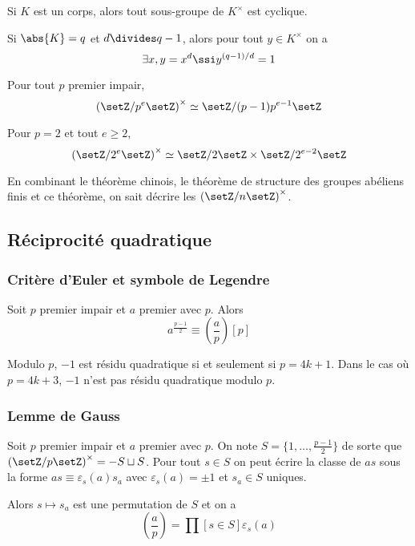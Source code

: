 \documentclass[a4paper,11pt,twocolumn]{article}
\begin{document}
     Si $K$ est un corps, alors tout sous-groupe de $K^\times$ est cyclique.

     Si $\abs{K}=q$ et $d\divides q-1$, alors pour tout $y\in K^\times$ on a
    \[\exists x, y = x^d \ssi y^{(q-1)/d} = 1\]

     Pour tout $p$ premier impair,
    \[\left(\setZ/p^e\setZ\right)^\times\simeq\setZ/(p-1)p^{e-1}\setZ\]

    Pour $p=2$ et tout $e\geq2$,
    \[\left(\setZ/2^e\setZ\right)^\times\simeq\setZ/2\setZ\times\setZ/2^{e-2}\setZ\]

    En combinant le théorème chinois, le théorème de structure des groupes abéliens finis et ce théorème, on sait décrire les $\left(\setZ/n\setZ\right)^\times$.


  \subsection{Réciprocité quadratique}

    \subsubsection{Critère d'Euler et symbole de Legendre}

       \cite[prop 1.5 p.~3]{mat552} Soit $p$ premier impair et $a$ premier avec $p$. Alors
      \[a^{\frac{p-1}2} \equiv \left(\frac{a}{p}\right) [p]\]

       Modulo $p$, $-1$ est résidu quadratique si et seulement si $p=4k+1$. Dans le cas où $p=4k+3$, $-1$ n'est pas résidu quadratique modulo $p$.

    \subsubsection{Lemme de Gauss}

       Soit $p$ premier impair et $a$ premier avec $p$. On note $S=\{1,\ldots,\frac{p-1}2\}$ de sorte que $\left(\setZ/p\setZ\right)^\times=-S\sqcup S$. Pour tout $s\in S$ on peut écrire la classe de $as$ sous la forme $as\equiv\varepsilon_s(a)s_a$ avec $\varepsilon_s(a)=\pm1$ et $s_a\in S$ uniques.

      Alors $s\mapsto s_a$ est une permutation de $S$ et on a
      \[\left(\frac{a}{p}\right) = \prod[s\in S]{\varepsilon_s(a)}\]
\end{document}
